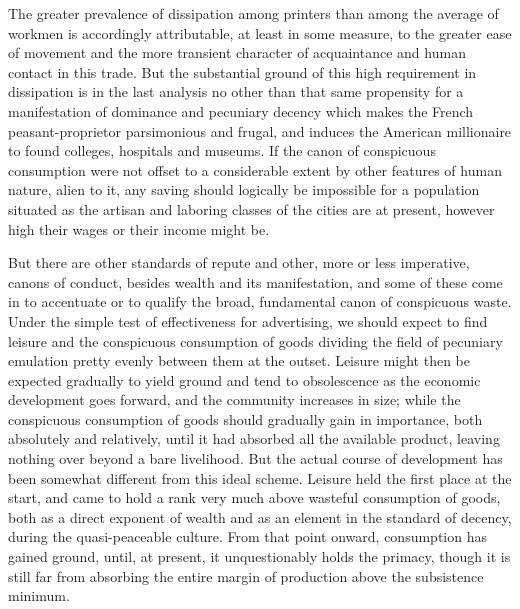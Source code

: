 \documentclass[12pt]{report}
\begin{document}
The greater prevalence of dissipation among printers than among the
average of workmen is accordingly attributable, at least in some
measure, to the greater ease of movement and the more transient
character of acquaintance and human contact in this trade. But the
substantial ground of this high requirement in dissipation is in the
last analysis no other than that same propensity for a manifestation
of dominance and pecuniary decency which makes the French
peasant-proprietor parsimonious and frugal, and induces the American
millionaire to found colleges, hospitals and museums. If the canon of
conspicuous consumption were not offset to a considerable extent by
other features of human nature, alien to it, any saving should logically
be impossible for a population situated as the artisan and laboring
classes of the cities are at present, however high their wages or their
income might be.

But there are other standards of repute and other, more or less
imperative, canons of conduct, besides wealth and its manifestation, and
some of these come in to accentuate or to qualify the broad, fundamental
canon of conspicuous waste. Under the simple test of effectiveness
for advertising, we should expect to find leisure and the conspicuous
consumption of goods dividing the field of pecuniary emulation pretty
evenly between them at the outset. Leisure might then be expected
gradually to yield ground and tend to obsolescence as the economic
development goes forward, and the community increases in size; while the
conspicuous consumption of goods should gradually gain in importance,
both absolutely and relatively, until it had absorbed all the available
product, leaving nothing over beyond a bare livelihood. But the actual
course of development has been somewhat different from this ideal
scheme. Leisure held the first place at the start, and came to hold a
rank very much above wasteful consumption of goods, both as a direct
exponent of wealth and as an element in the standard of decency, during
the quasi-peaceable culture. From that point onward, consumption has
gained ground, until, at present, it unquestionably holds the primacy,
though it is still far from absorbing the entire margin of production
above the subsistence minimum.
\end{document}
